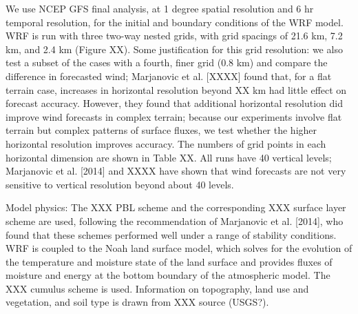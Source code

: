 \documentclass[12pt]{amsart}
\begin{document}
We use NCEP GFS final analysis, at 1 degree spatial resolution and 6 hr temporal resolution, for the initial and boundary conditions of the WRF model.  WRF is run with three two-way nested grids, with grid spacings of 21.6 km, 7.2 km, and 2.4 km (Figure XX).  Some justification for this grid resolution: we also test a subset of the cases with a fourth, finer grid (0.8 km) and compare the difference in forecasted wind; Marjanovic et al. [XXXX] found that, for a flat terrain case, increases in horizontal resolution beyond XX km had little effect on forecast accuracy.  However, they found that additional horizontal resolution did improve wind forecasts in complex terrain; because our experiments involve flat terrain but complex patterns of surface fluxes, we test whether the higher horizontal resolution improves accuracy.  The numbers of grid points in each horizontal dimension are shown in Table XX.  All runs have 40 vertical levels; Marjanovic et al. [2014] and XXXX have shown that wind forecasts are not very sensitive to vertical resolution beyond about 40 levels.

Model physics: The XXX PBL scheme and the corresponding XXX surface layer scheme are used, following the recommendation of Marjanovic et al. [2014], who found that these schemes performed well under a range of stability conditions.  WRF is coupled to the Noah land surface model, which solves for the evolution of the temperature and moisture state of the land surface and provides fluxes of moisture and energy at the bottom boundary of the atmospheric model.  The XXX cumulus scheme is used.  Information on topography, land use and vegetation, and soil type is drawn from XXX source (USGS?).
\end{document}
